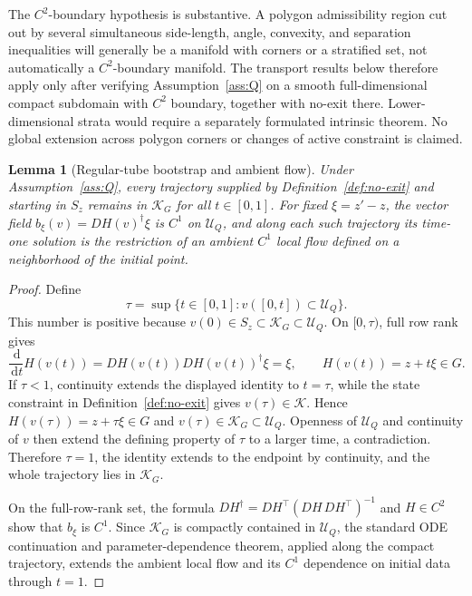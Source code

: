 \documentclass[11pt]{article}
\newtheorem{lemma}[theorem]{Lemma}
\theoremstyle{definition}
\newcommand{\dd}{\,\mathrm d}
\begin{document}
The $C^2$-boundary hypothesis is substantive.  A polygon admissibility region
cut out by several simultaneous side-length, angle, convexity, and separation
inequalities will generally be a manifold with corners or a stratified set,
not automatically a $C^2$-boundary manifold.  The transport results below
therefore apply only after verifying Assumption~\ref{ass:Q} on a smooth
full-dimensional compact subdomain with $C^2$ boundary, together with no-exit
there.  Lower-dimensional strata would require a separately formulated
intrinsic theorem.  No global extension across polygon corners or changes of
active constraint is claimed.

\begin{lemma}[Regular-tube bootstrap and ambient flow]
\label{lem:regular-tube-bootstrap}
Under Assumption~\ref{ass:Q}, every trajectory supplied by
Definition~\ref{def:no-exit} and starting in $S_z$ remains in $\mathcal K_G$
for all $t\in[0,1]$.  For fixed $\xi=z'-z$, the vector field
$b_\xi(v)=DH(v)^\dagger\xi$ is $C^1$ on $\mathcal U_Q$, and along each such
trajectory its time-one solution is the restriction of an ambient $C^1$ local
flow defined on a neighborhood of the initial point.
\end{lemma}

\begin{proof}
Define
\[
 \tau=\sup\{t\in[0,1]:v([0,t])\subset\mathcal U_Q\}.
\]
This number is positive because
$v(0)\in S_z\subset\mathcal K_G\subset\mathcal U_Q$.  On $[0,\tau)$, full
row rank gives
\[
 \frac{\dd}{\dd t}H(v(t))=DH(v(t))DH(v(t))^\dagger\xi=\xi,
 \qquad H(v(t))=z+t\xi\in G.
\]
If $\tau<1$, continuity extends the displayed identity to $t=\tau$, while
the state constraint in Definition~\ref{def:no-exit} gives
$v(\tau)\in\mathcal K$.  Hence $H(v(\tau))=z+\tau\xi\in G$ and
$v(\tau)\in\mathcal K_G\subset\mathcal U_Q$.  Openness of $\mathcal U_Q$
and continuity of $v$ then extend the defining property of $\tau$ to a larger
time, a contradiction.  Therefore $\tau=1$, the identity extends to the
endpoint by continuity, and the whole trajectory lies in $\mathcal K_G$.

On the full-row-rank set, the formula
$DH^\dagger=DH^\top(DH\,DH^\top)^{-1}$ and $H\in C^2$ show that $b_\xi$ is
$C^1$.  Since $\mathcal K_G$ is compactly contained in $\mathcal U_Q$, the
standard ODE continuation and parameter-dependence theorem, applied along the
compact trajectory, extends the ambient local flow and its $C^1$ dependence
on initial data through $t=1$.
\end{proof}
\end{document}
